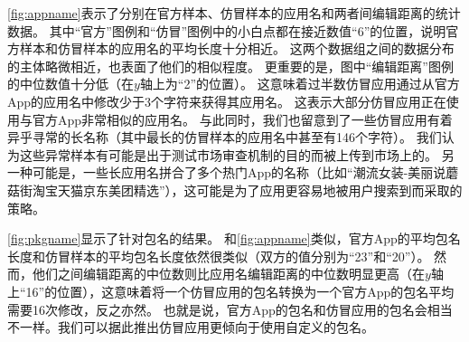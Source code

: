 \autoref{fig:appname}表示了分别在官方样本、仿冒样本的应用名和两者间编辑距离的统计数据。
其中``官方''图例和``仿冒''图例中的小白点都在接近数值``6''的位置，说明官方样本和仿冒样本的应用名的平均长度十分相近。
这两个数据组之间的数据分布的主体略微相近，也表面了他们的相似程度。
更重要的是，图中``编辑距离''图例的中位数值十分低（在$y$轴上为``2''的位置）。
这意味着过半数仿冒应用通过从官方App的应用名中修改少于3个字符来获得其应用名。
这表示大部分仿冒应用正在使用与官方App非常相似的应用名。
与此同时，我们也留意到了一些仿冒应用有着异乎寻常的长名称（其中最长的仿冒样本的应用名中甚至有146个字符）。
我们认为这些异常样本有可能是出于测试市场审查机制的目的而被上传到市场上的。
另一种可能是，一些长应用名拼合了多个热门App的名称（比如``潮流女装-美丽说蘑菇街淘宝天猫京东美团精选''），这可能是为了应用更容易地被用户搜索到而采取的策略。

\autoref{fig:pkgname}显示了针对包名的结果。
和\autoref{fig:appname}类似，官方App的平均包名长度和仿冒样本的平均包名长度依然很类似（双方的值分别为``23''和``20''）。
然而，他们之间编辑距离的中位数则比应用名编辑距离的中位数明显更高（在$y$轴上``16''的位置），这意味着将一个仿冒应用的包名转换为一个官方App的包名平均需要16次修改，反之亦然。
也就是说，官方App的包名和仿冒应用的包名会相当不一样。我们可以据此推出仿冒应用更倾向于使用自定义的包名。

